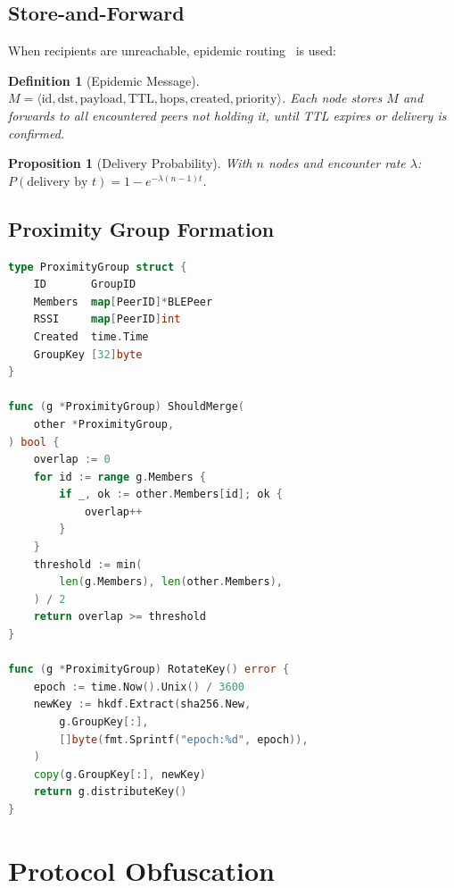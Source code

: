 \documentclass[11pt,a4paper]{article}
\newtheorem{definition}{Definition}[section]
\newtheorem{proposition}{Proposition}[section]
\begin{document}
\subsection{Store-and-Forward}

When recipients are unreachable, epidemic
routing~\cite{vahdat2000epidemic} is used:

\begin{definition}[Epidemic Message]
    $M = \langle \mathrm{id}, \mathrm{dst}, \mathrm{payload},
    \mathrm{TTL}, \mathrm{hops}, \mathrm{created},
    \mathrm{priority} \rangle$.
    Each node stores $M$ and forwards to all encountered peers not holding
    it, until TTL expires or delivery is confirmed.
\end{definition}

\begin{proposition}[Delivery Probability]
    With $n$ nodes and encounter rate $\lambda$:
    $P(\text{delivery by } t) = 1 - e^{-\lambda(n-1)t}$.
\end{proposition}

\subsection{Proximity Group Formation}

\begin{lstlisting}[language=Go,caption={Proximity Group}]
type ProximityGroup struct {
    ID       GroupID
    Members  map[PeerID]*BLEPeer
    RSSI     map[PeerID]int
    Created  time.Time
    GroupKey [32]byte
}

func (g *ProximityGroup) ShouldMerge(
    other *ProximityGroup,
) bool {
    overlap := 0
    for id := range g.Members {
        if _, ok := other.Members[id]; ok {
            overlap++
        }
    }
    threshold := min(
        len(g.Members), len(other.Members),
    ) / 2
    return overlap >= threshold
}

func (g *ProximityGroup) RotateKey() error {
    epoch := time.Now().Unix() / 3600
    newKey := hkdf.Extract(sha256.New,
        g.GroupKey[:],
        []byte(fmt.Sprintf("epoch:%d", epoch)),
    )
    copy(g.GroupKey[:], newKey)
    return g.distributeKey()
}
\end{lstlisting}

\section{Protocol Obfuscation}
\label{sec:obfuscation}
\end{document}
